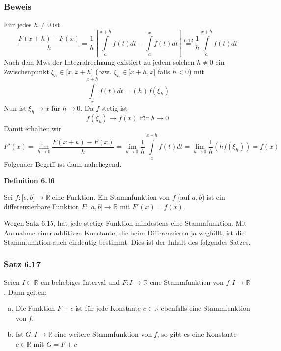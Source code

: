 \subsubsection*{Beweis}
Für jedes $h\neq 0$ ist \[\frac{{F(x + h) - F(x)}}{h} = \frac{1}{h}\left[ {\int\limits_a^{x + h} {f(t)dt}  - \int\limits_a^x {f(t)dt} } \right] \mathop  = \limits^{6.12}  \frac{1}{h}\int\limits_a^{x + h} {f(t)dt} \]
Nach dem Mws der Integralrechnung existiert zu jedem solchen $h\neq 0$ ein Zwischenpunkt $\xi_h\in\lbrack x,x+h\rbrack$ (bzw. $\xi_h\in\lbrack x + h,x\rbrack$ falls $h<0$) mit \[\int\limits_x^{x + h} {f(t)dt = (h)f({\xi _h})} \]
Nun ist $\xi_h \rightarrow x$ für $h\rightarrow 0$. Da $f$ stetig ist $$f(\xi_h)\rightarrow f(x) \text{ für } h\rightarrow 0$$
Damit erhalten wir \[F'(x) = \mathop {\lim }\limits_{h \to 0} \frac{{F(x + h) - F(x)}}{h} = \mathop {\lim }\limits_{h \to 0} \frac{1}{h}\int\limits_x^{x + h} {f(t)dt = } \mathop {\lim }\limits_{h \to 0} \frac{1}{h}(hf({\xi _h})) = f(x)\]
Folgender Begriff ist dann naheliegend. \\

\begin{framed}
\centerline{\textbf{Definition 6.16}}
\noindent Sei $f:\lbrack a,b\rbrack\rightarrow\mathbb{R}$ eine Funktion. Ein Stammfunktion von $f$ (auf $a,b$) ist ein differenzierbare Funktion $F:\lbrack a,b\rbrack\rightarrow\mathbb{R}$ mit $F'(x)=f(x)$.\\
\end{framed}
\noindent Wegen Satz 6.15, hat jede stetige Funktion mindestens eine Stammfunktion. Mit Ausnahme einer additiven Konstante, die beim Differenzieren ja wegfällt, ist die Stammfunktion auch eindeutig bestimmt. Dies ist der Inhalt des folgendes Satzes.\\

\subsubsection*{Satz 6.17}
Seien $I\subset \mathbb{R}$ ein beliebiges Interval und $F:I\rightarrow\mathbb{R}$ eine Stammfunktion von $f:I\rightarrow\mathbb{R}$. Dann gelten:
\begin{enumerate}[(a)]
\item Die Funktion $F+c$ ist für jede Konstante $c\in\mathbb{R}$ ebenfalls eine Stammfunktion von $f$.
\item Ist $G:I\rightarrow\mathbb{R}$ eine weitere Stammfunktion von $f$, so gibt es eine Konstante $c\in\mathbb{R}$ mit $G=F+c$
\end{enumerate}

